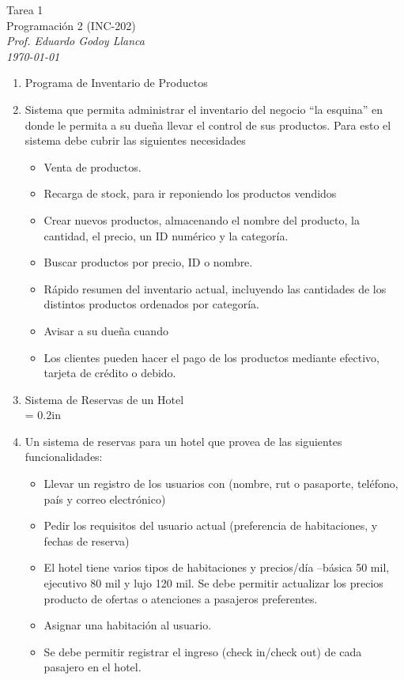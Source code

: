 \documentclass[10pt]{article}
\begin{document}
\begin{center}
	{\Large Tarea 1}\\
	 Programaci\'on 2 (INC-202)\\
	\emph{\small Prof. Eduardo Godoy Llanca} \\
	\emph{\scriptsize \small{\today}}
\end{center}

\begin{enumerate}
		\item {\large Programa de Inventario de Productos}\\
		\item[] Sistema que permita administrar el inventario del negocio “la esquina” en donde le
		permita a su dueña llevar el control de sus productos.  Para esto el sistema debe cubrir las siguientes
		necesidades
\begin{itemize}
	\item	Venta de productos.
	\item	Recarga de stock, para ir reponiendo los productos vendidos
	\item	Crear nuevos productos, almacenando el nombre del producto, la cantidad, el precio, un ID numérico y la
	categoría.
	\item	Buscar productos por precio, ID o nombre.
	\item	Rápido resumen del inventario actual, incluyendo las cantidades de los distintos productos ordenados
	 por categoría.
	\item	Avisar a su dueña cuando
	\item	Los clientes pueden hacer el pago de los productos mediante efectivo, tarjeta de crédito o debido.
\end{itemize}


		\item {\large Sistema de Reservas de un Hotel}\\
		\parskip = 0.2in
		\item[] Un sistema de reservas para un hotel que provea de las siguientes funcionalidades:
\begin{itemize}
	\item Llevar un registro de los usuarios con (nombre, rut o pasaporte, teléfono, país y correo electrónico)
\item Pedir los requisitos del usuario actual (preferencia de habitaciones, y fechas de reserva)
\item	El hotel tiene varios tipos de habitaciones y precios/día –básica 50 mil, ejecutivo 80 mil y lujo 120 mil. Se debe permitir actualizar los precios producto de ofertas o atenciones a pasajeros preferentes.
\item	Asignar una habitación al usuario.
\item	Se debe permitir registrar el ingreso (check in/check out) de cada pasajero en el hotel.

\end{itemize}

\end{enumerate}
\end{document}
